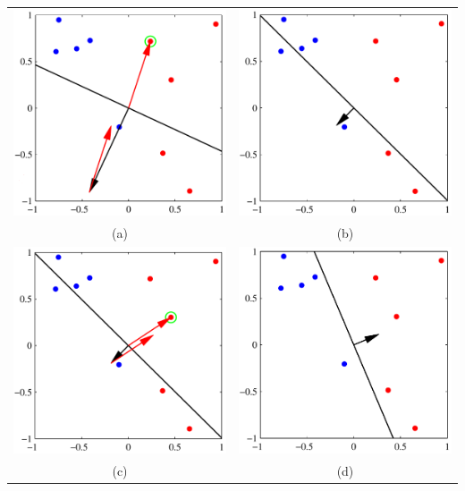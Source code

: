 \documentclass[main.tex]{subfiles}
\begin{document}
\begin{center}
    \begin{tabular}{cc}
        \includegraphics[width=65mm]{img/Perceptron_Alg1.PNG} & \includegraphics[width=65mm]{img/Perceptron_Alg2.PNG} \\
        (a)                                                   & (b)                                                   \\[6pt]
        \includegraphics[width=65mm]{img/Perceptron_Alg3.PNG} & \includegraphics[width=65mm]{img/Perceptron_Alg4.PNG} \\
        (c)                                                   & (d)                                                   \\[6pt]
    \end{tabular}
\end{center}
\end{document}
